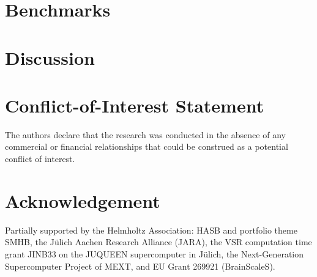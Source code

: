 \documentclass{frontiersSCNS} %
\begin{document}

\section{Benchmarks}


\section{Discussion}


% 

\section*{Conflict-of-Interest Statement}
The authors declare that the research was conducted in the absence of
any commercial or financial relationships that could be construed as a
potential conflict of interest.

\section*{Acknowledgement}
Partially supported by the Helmholtz Association: HASB and portfolio
theme SMHB, the Jülich Aachen Research Alliance (JARA), the VSR
computation time grant JINB33 on the JUQUEEN supercomputer in Jülich,
the Next-Generation Supercomputer Project of MEXT, and EU Grant 269921
(BrainScaleS).




\end{document}
